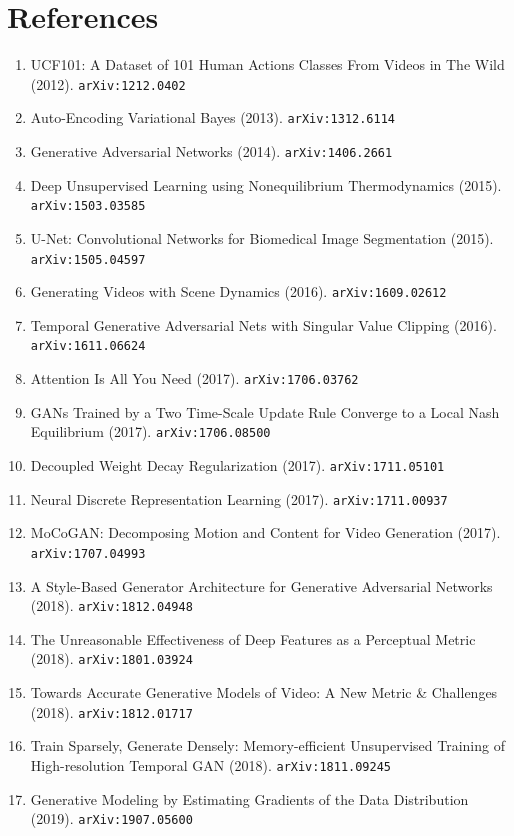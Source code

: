 \documentclass[11pt]{article}
\begin{document}
\section*{References}
\begin{enumerate}\small
  \item UCF101: A Dataset of 101 Human Actions Classes From Videos in The Wild (2012). \texttt{arXiv:1212.0402}
  \item Auto-Encoding Variational Bayes (2013). \texttt{arXiv:1312.6114}
  \item Generative Adversarial Networks (2014). \texttt{arXiv:1406.2661}
  \item Deep Unsupervised Learning using Nonequilibrium Thermodynamics (2015). \texttt{arXiv:1503.03585}
  \item U-Net: Convolutional Networks for Biomedical Image Segmentation (2015). \texttt{arXiv:1505.04597}
  \item Generating Videos with Scene Dynamics (2016). \texttt{arXiv:1609.02612}
  \item Temporal Generative Adversarial Nets with Singular Value Clipping (2016). \texttt{arXiv:1611.06624}
  \item Attention Is All You Need (2017). \texttt{arXiv:1706.03762}
  \item GANs Trained by a Two Time-Scale Update Rule Converge to a Local Nash
  Equilibrium (2017). \texttt{arXiv:1706.08500}
  \item Decoupled Weight Decay Regularization (2017). \texttt{arXiv:1711.05101}
  \item Neural Discrete Representation Learning (2017). \texttt{arXiv:1711.00937}
  \item MoCoGAN: Decomposing Motion and Content for Video Generation (2017). \texttt{arXiv:1707.04993}
  \item A Style-Based Generator Architecture for Generative Adversarial Networks (2018). \texttt{arXiv:1812.04948}
  \item The Unreasonable Effectiveness of Deep Features as a Perceptual Metric (2018). \texttt{arXiv:1801.03924}
  \item Towards Accurate Generative Models of Video: A New Metric \& Challenges (2018). \texttt{arXiv:1812.01717}
  \item Train Sparsely, Generate Densely: Memory-efficient Unsupervised Training
  of High-resolution Temporal GAN (2018). \texttt{arXiv:1811.09245}
  \item Generative Modeling by Estimating Gradients of the Data Distribution (2019). \texttt{arXiv:1907.05600}

\end{enumerate}
\end{document}
